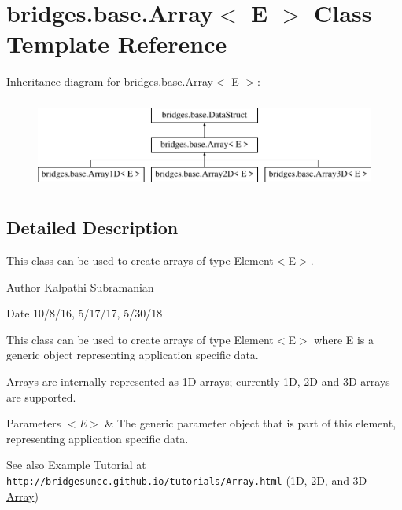 \hypertarget{classbridges_1_1base_1_1_array}{}\section{bridges.\+base.\+Array$<$ E $>$ Class Template Reference}
\label{classbridges_1_1base_1_1_array}
Inheritance diagram for bridges.\+base.\+Array$<$ E $>$\+:\begin{figure}[H]
\begin{center}
\leavevmode
\includegraphics[height=3.000000cm]{classbridges_1_1base_1_1_array}
\end{center}
\end{figure}


\subsection{Detailed Description}
This class can be used to create arrays of type Element$<$\+E$>$. 

\begin{DoxyAuthor}{Author}
Kalpathi Subramanian
\end{DoxyAuthor}
\begin{DoxyDate}{Date}
10/8/16, 5/17/17, 5/30/18
\end{DoxyDate}
This class can be used to create arrays of type Element$<$\+E$>$ where E is a generic object representing application specific data.

Arrays are internally represented as 1D arrays; currently 1D, 2D and 3D arrays are supported.


\begin{DoxyParams}{Parameters}
{\em $<$\+E$>$} & The generic parameter object that is part of this element, representing application specific data.\\
\hline
\end{DoxyParams}
\begin{DoxySeeAlso}{See also}
Example Tutorial at ~\newline
 \href{http://bridgesuncc.github.io/tutorials/Array.html}{\tt http\+://bridgesuncc.\+github.\+io/tutorials/\+Array.\+html} (1D, 2D, and 3D \mbox{\hyperlink{classbridges_1_1base_1_1_array}{Array}})~\newline
 
\end{DoxySeeAlso}
